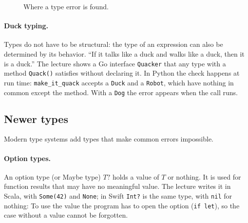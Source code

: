 \begin{figure}[h]
\centering
{}
\caption{Where a type error is found.}
\label{fig:static-dynamic}
\end{figure}

\paragraph{Duck typing.} Types do not have to be structural: the type of an
expression can also be determined by its behavior. ``If it talks like a duck
and walks like a duck, then it is a duck.'' The lecture shows a Go interface
\texttt{Quacker} that any type with a method \texttt{Quack()} satisfies without
declaring it. In Python the check happens at run time:
\texttt{make\_it\_quack} accepts a \texttt{Duck} and a \texttt{Robot}, which have
nothing in common except the method. With a \texttt{Dog} the error appears when
the call runs.

\subsection{Newer types}

Modern type systems add types that make common errors impossible.

\paragraph{Option types.} An option type (or Maybe type) $T?$ holds a value of
$T$ or nothing. It is used for function results that may have no meaningful
value. The lecture writes it in Scala, with \texttt{Some(42)} and
\texttt{None}; in Swift \texttt{Int?} is the same type, with \texttt{nil} for
nothing:
To use the value the program has to open the option (\texttt{if let}), so the
case without a value cannot be forgotten.

